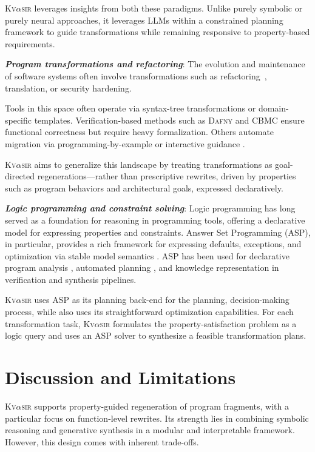 \documentclass[nonacm,sigplan,review]{acmart}
\newcommand{\sys}{{\scshape Kv{$\alpha$}sir}\xspace}
\newcommand{\heading}[1]{\vspace{2pt}\noindent\textbf{\emph{#1}}:\enspace}
\begin{document}
\sys leverages insights from both these paradigms.
Unlike purely symbolic or purely neural approaches, it leverages LLMs within a
constrained planning framework to guide transformations while remaining
responsive to property-based requirements.

\heading{Program transformations and refactoring}
The evolution and maintenance of software systems often involve transformations
such as refactoring~\cite{Fowler99,Mens04,Myers16}, translation, or security hardening. %

Tools in this space often operate via syntax-tree transformations or
domain-specific templates. Verification-based methods such as \textsc{Dafny}
\cite{leino2016dafny} and \textsc{CBMC} \cite{Clarke04} ensure functional correctness
but require heavy formalization.
Others automate migration via
programming-by-example or interactive guidance \cite{gulwani2017program, le2017interactive}.


\sys aims to generalize this landscape by treating transformations as
goal-directed regenerations---rather than prescriptive rewrites, driven by
properties such as program behaviors and architectural goals, expressed declaratively.

\heading{Logic programming and constraint solving}
Logic programming has long served as a foundation for reasoning in programming
tools, offering a declarative model for expressing properties and constraints.
Answer Set Programming (ASP), in particular, provides a rich framework for
expressing defaults, exceptions, and optimization via stable model semantics
\cite{Gelfond_2000, Gelfond_2002, Eiter_2009}. 
ASP has been used for
declarative program analysis \cite{benton2007interactive}, automated planning
\cite{nguyen2020explainable, son2022answersetplanningsurvey}, and knowledge
representation in verification and synthesis pipelines.

\sys uses ASP as its planning back-end for the planning, decision-making
process, while also uses its straightforward optimization capabilities.
For each transformation task, \sys formulates the property-satisfaction problem as a logic query and uses an ASP solver to
synthesize a feasible transformation plans.

\section{Discussion and Limitations}
\label{sec:discussion}

\sys supports property-guided regeneration of program fragments, with a
particular focus on function-level rewrites. Its strength lies in combining
symbolic reasoning and generative synthesis in a modular and interpretable
framework. However, this design comes with inherent trade-offs.
\end{document}
